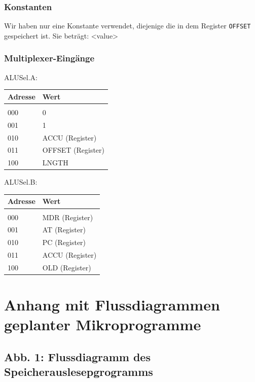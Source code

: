 \documentclass[12pt,titlepage]{article}
\begin{document}
\subsubsection{Konstanten}
Wir haben nur eine Konstante verwendet, diejenige die in dem Register \texttt{OFFSET} gespeichert ist. Sie beträgt: <value>

\subsubsection{Multiplexer-Eingänge}

ALUSel.A:

\begin{table}
    \begin{tabular}{l|l}
    Adresse & Wert              \\
    \hline  					\\
    000     & 0                 \\
    001     & 1                 \\
    010     & ACCU (Register)   \\
    011     & OFFSET (Register) \\
    100     & LNGTH             \\
    \end{tabular}
\end{table}

ALUSel.B:

\begin{table}
    \begin{tabular}{l|l}
    Adresse & Wert            \\
    \hline                    \\
    000     & MDR (Register)  \\
    001     & AT (Register)   \\
    010     & PC (Register)   \\
    011     & ACCU (Register) \\
    100     & OLD (Register)  \\
    \end{tabular}
\end{table}


\section{Anhang mit Flussdiagrammen \\ geplanter Mikroprogramme}

\subsection{Abb. 1: Flussdiagramm des Speicherauslesepgrogramms}
\end{document}
